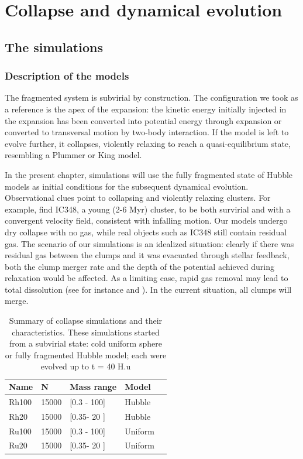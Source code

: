 

\chapter{Collapse and dynamical evolution}



\section{The simulations}

\subsection{Description of the models}

The \HubLem fragmented system is subvirial by construction. The configuration we took as a reference is the apex of the expansion: the kinetic energy initially injected in the expansion has been converted into potential energy through expansion or converted to transversal motion by two-body interaction. If the model is left to evolve further, it collapses, violently relaxing to reach a quasi-equilibrium state, resembling a Plummer or King model.

In the present chapter, simulations will use the fully fragmented state of Hubble models as initial conditions for the subsequent dynamical evolution. Observational clues point to  collapsing and violently relaxing clusters. For example, \cite{Cottaar2015} find IC348, a young (2-6 Myr) cluster, to be both survirial and with a convergent velocity field, consistent with infalling motion. Our models undergo dry collapse with no gas, while real objects such as IC348 still contain residual gas. The scenario of our simulations is an idealized situation: clearly if there was residual gas between the clumps and it was evacuated through stellar feedback, both the clump merger rate and the depth of the potential achieved during relaxation would be affected. As a limiting case, rapid gas removal may lead to total dissolution (see for instance \citealt{Moeckel2012} and \citealt{Fujii2016}). In the current situation, all clumps will merge. 


\begin{table}
\begin{center}
\caption{Summary of collapse simulations and their characteristics. These simulations started from a subvirial state: cold uniform sphere or fully fragmented Hubble model; each were evolved up to t = 40 H.u}
\label{Tab:evolution_models}
\begin{tabularx}{0.6\textwidth}{XXlXX}
\hline
Name & N & Mass range & Model \\
\hline
Rh100 & 15000 & [0.3 - 100] & Hubble  \\
Rh20 & 15000 & [0.35- 20 ] & Hubble  \\
Ru100 & 15000 & [0.3 - 100] & Uniform  \\
Ru20 & 15000 & [0.35- 20 ] & Uniform  \\
\hline
\end{tabularx}
\end{center}
\end{table}



